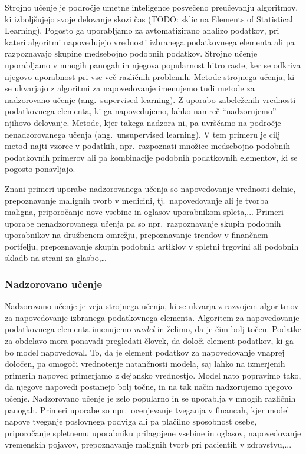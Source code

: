 \documentclass[12pt,a4paper,twoside]{article}
\theoremstyle{definition} %
\theoremstyle{plain} %
\numberwithin{equation}{section}  %
\begin{document}
Strojno učenje je področje umetne inteligence posvečeno preučevanju algoritmov, 
ki izboljšujejo svoje delovanje skozi čas (TODO: sklic na Elements of Statistical Learning). 
Pogosto ga uporabljamo za avtomatizirano analizo podatkov, pri kateri algoritmi napovedujejo vrednosti izbranega podatkovnega elementa ali pa razpoznavajo skupine medsebojno podobnih podatkov. 
Strojno učenje uporabljamo v mnogih panogah in njegova popularnost hitro raste, ker se odkriva njegovo uporabnost pri vse več različnih problemih. 
Metode strojnega učenja, ki se ukvarjajo z algoritmi za napovedovanje imenujemo tudi metode za nadzorovano učenje (ang.~supervised learning). 
Z uporabo zabeleženih vrednosti podatkovnega elementa, ki ga napovedujemo, lahko namreč ``nadzorujemo'' njihovo delovanje. 
Metode, kjer takega nadzora ni, pa uvrščamo na področje nenadzorovanega učenja (ang.~unsupervised learning). 
V tem primeru je cilj metod najti vzorce v podatkih, npr.\ razpoznati množice medsebojno podobnih podatkovnih primerov ali pa kombinacije podobnih podatkovnih elementov, ki se pogosto ponavljajo.

Znani primeri uporabe nadzorovanega učenja so napovedovanje vrednosti delnic, prepoznavanje malignih tvorb v medicini, tj.~napovedovanje ali je tvorba maligna, priporočanje nove vsebine in oglasov uporabnikom spleta,... 
Primeri uporabe nenadzorovanega učenja pa so npr.\ razpoznavanje skupin podobnih uporabnikov na družbenem omrežju, prepoznavanje trendov v finančnem portfelju, prepoznavanje skupin podobnih artiklov v spletni trgovini ali podobnih skladb na strani za glasbo,\dots


\subsubsection{Nadzorovano učenje}

Nadzorovano učenje je veja strojnega učenja, ki se ukvarja z razvojem algoritmov za napovedovanje izbranega podatkovnega elementa. 
Algoritem za napovedovanje podatkovnega elementa imenujemo \emph{model} in želimo, da je čim bolj točen. 
Podatke za obdelavo mora ponavadi pregledati človek, da določi element podatkov, ki ga bo model napovedoval.
To, da je element podatkov za napovedovanje vnaprej določen, pa omogoči vrednotenje natančnosti modela, saj lahko na izmerjenih primerih napoved primerjamo z dejansko vrednostjo. 
Model nato popravimo tako, da njegove napovedi postanejo bolj točne, in na tak način nadzorujemo njegovo učenje. 
Nadzorovano učenje je zelo popularno in se uporablja v mnogih različnih panogah. Primeri uporabe so 
npr.\ ocenjevanje tveganja v financah, kjer model napove tveganje poslovnega podviga ali pa plačilno sposobnost osebe, 
priporočanje spletnemu uporabniku prilagojene vsebine in oglasov, napovedovanje vremenskih pojavov, prepoznavanje malignih tvorb pri pacientih v zdravstvu,...
\end{document}
